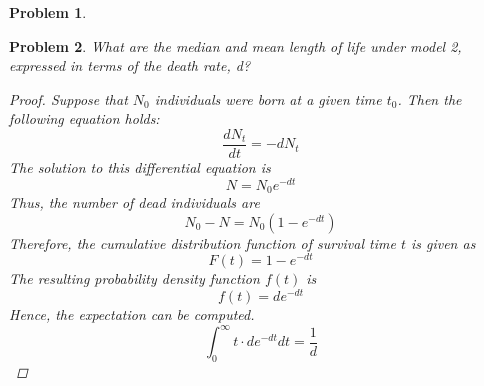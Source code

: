 \documentclass[12pt]{report}
\newtheorem{problem}{Problem}[chapter]
\begin{document}
\begin{problem}
        \end{problem}

        \begin{problem}
            What are the median and mean length of life under model 2, expressed in terms of the death rate, d?
            \begin{proof}
                Suppose that $N_0$ individuals were born at a given time $t_0$. 
                Then the following equation holds:
                \begin{equation*}
                    \frac{dN_t}{dt} = -dN_t
                \end{equation*}
                The solution to this differential equation is 
                \begin{equation*}
                    N = N_0 e^{-dt}
                \end{equation*}
                Thus, the number of dead individuals are
                \begin{equation*}
                    N_0 - N = N_0(1-e^{-dt})
                \end{equation*}
                Therefore, the cumulative distribution function of survival time $t$ is given as
                \begin{equation*}
                    F(t) = 1- e^{-dt}
                \end{equation*}
                The resulting probability density function $f(t)$ is
                \begin{equation*}
                    f(t) = de^{-dt}
                \end{equation*}
                Hence, the expectation can be computed.
                \begin{equation*}
                    \int_{0}^{\infty} {t \cdot de^{-dt} dt} = \frac{1}{d}
                \end{equation*}
            \end{proof}
        \end{problem}
    
\end{document}
